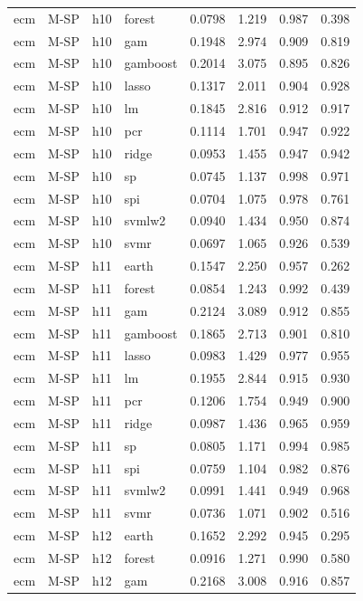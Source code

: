 \begin{ThreePartTable}
\begin{longtable}[t]{llclcccc}
ecm & M-SP & h10 & forest & 0.0798 & 1.219 & 0.987 & 0.398\\
ecm & M-SP & h10 & gam & 0.1948 & 2.974 & 0.909 & 0.819\\
ecm & M-SP & h10 & gamboost & 0.2014 & 3.075 & 0.895 & 0.826\\
ecm & M-SP & h10 & lasso & 0.1317 & 2.011 & 0.904 & 0.928\\
ecm & M-SP & h10 & lm & 0.1845 & 2.816 & 0.912 & 0.917\\
ecm & M-SP & h10 & pcr & 0.1114 & 1.701 & 0.947 & 0.922\\
ecm & M-SP & h10 & ridge & 0.0953 & 1.455 & 0.947 & 0.942\\
ecm & M-SP & h10 & sp & 0.0745 & 1.137 & 0.998 & 0.971\\
ecm & M-SP & h10 & spi & 0.0704 & 1.075 & 0.978 & 0.761\\
ecm & M-SP & h10 & svmlw2 & 0.0940 & 1.434 & 0.950 & 0.874\\
ecm & M-SP & h10 & svmr & 0.0697 & 1.065 & 0.926 & 0.539\\
\addlinespace
ecm & M-SP & h11 & earth & 0.1547 & 2.250 & 0.957 & 0.262\\
ecm & M-SP & h11 & forest & 0.0854 & 1.243 & 0.992 & 0.439\\
ecm & M-SP & h11 & gam & 0.2124 & 3.089 & 0.912 & 0.855\\
ecm & M-SP & h11 & gamboost & 0.1865 & 2.713 & 0.901 & 0.810\\
ecm & M-SP & h11 & lasso & 0.0983 & 1.429 & 0.977 & 0.955\\
ecm & M-SP & h11 & lm & 0.1955 & 2.844 & 0.915 & 0.930\\
ecm & M-SP & h11 & pcr & 0.1206 & 1.754 & 0.949 & 0.900\\
ecm & M-SP & h11 & ridge & 0.0987 & 1.436 & 0.965 & 0.959\\
ecm & M-SP & h11 & sp & 0.0805 & 1.171 & 0.994 & 0.985\\
ecm & M-SP & h11 & spi & 0.0759 & 1.104 & 0.982 & 0.876\\
ecm & M-SP & h11 & svmlw2 & 0.0991 & 1.441 & 0.949 & 0.968\\
ecm & M-SP & h11 & svmr & 0.0736 & 1.071 & 0.902 & 0.516\\
\addlinespace
ecm & M-SP & h12 & earth & 0.1652 & 2.292 & 0.945 & 0.295\\
ecm & M-SP & h12 & forest & 0.0916 & 1.271 & 0.990 & 0.580\\
ecm & M-SP & h12 & gam & 0.2168 & 3.008 & 0.916 & 0.857\\

\end{longtable}
\end{ThreePartTable}
